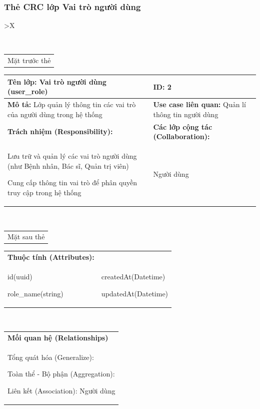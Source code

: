 \subsubsection{Thẻ CRC lớp Vai trò người dùng}

\begin{xltabular}{\textwidth}{
		>{\centering\arraybackslash}X
	}
	\caption{\bfseries \fontsize{12pt}{0pt}\selectfont Thẻ CRC lớp Vai trò người dùng}
	\\
	\begin{tabularx}{0.9\textwidth}{X}
		Mặt trước thẻ
	\end{tabularx}
	\begin{tabularx}{0.9\textwidth}{|X|X|}
		\hline
		\textbf{Tên lớp:} Vai trò người dùng (user\_role)                               & \textbf{ID:} 2                                             \\
		\hline
		\textbf{Mô tả:} Lớp quản lý thông tin các vai trò của người dùng trong hệ thống & \textbf{Use case liên quan:}  Quản lí thông tin người dùng \\
		\hline
		\textbf{Trách nhiệm (Responsibility):}                                          & \textbf{Các lớp cộng tác (Collaboration):}                 \\
		Lưu trữ và quản lý các vai trò người dùng (như Bệnh nhân, Bác sĩ, Quản trị viên)

		Cung cấp thông tin vai trò để phân quyền truy cập trong hệ thống
		                                                                                &
		Người dùng
		\\
		\hline
	\end{tabularx}
	\\
	\begin{tabularx}{0.9\textwidth}{X}
		Mặt sau thẻ
	\end{tabularx}
	\begin{tabularx}{0.9\textwidth}{|X|X|}
		\hline
		\textbf{Thuộc tính (Attributes):} & \\
		id(uuid)

		role\_name(string)
		                                  &
		createdAt(Datetime)

		updatedAt(Datetime)
		\\ \hline
	\end{tabularx}
	\\
	\begin{tabularx}{0.9\textwidth}{|X|}
		\hline
		\textbf{Mối quan hệ (Relationships)} \\
		Tổng quát hóa (Generalize):

		Toàn thể - Bộ phận (Aggregation):

		Liên kết (Association): Người dùng
		\\
		\hline
	\end{tabularx}
\end{xltabular}

